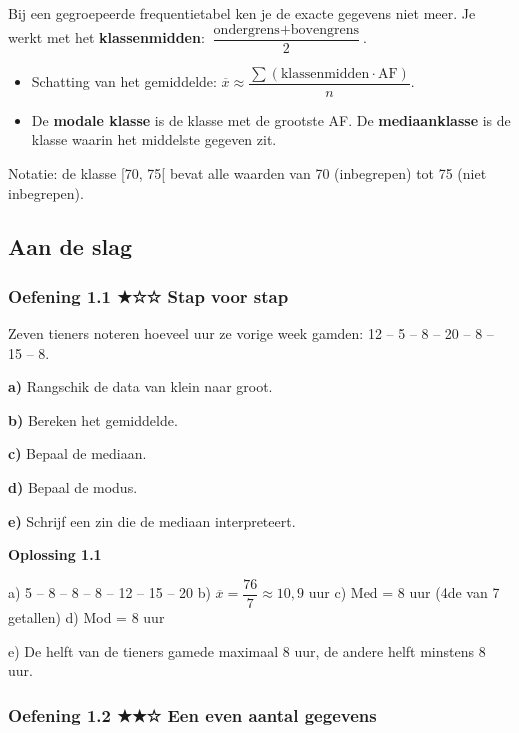 \begin{theorie}
Bij een gegroepeerde frequentietabel ken je de exacte gegevens niet meer. Je werkt met het \textbf{klassenmidden}: $\dfrac{\text{ondergrens}+\text{bovengrens}}{2}$.

\begin{itemize}
\item Schatting van het gemiddelde: $\overline{x}\approx\dfrac{\sum(\text{klassenmidden}\cdot \text{AF})}{n}$.
\item De \textbf{modale klasse} is de klasse met de grootste AF. De \textbf{mediaanklasse} is de klasse waarin het middelste gegeven zit.
\end{itemize}

Notatie: de klasse [70, 75[ bevat alle waarden van 70 (inbegrepen) tot 75 (niet inbegrepen).
\end{theorie}

\subsection*{Aan de slag}

\subsubsection*{Oefening 1.1 \quad ★☆☆ \quad Stap voor stap}

Zeven tieners noteren hoeveel uur ze vorige week gamden: 12 – 5 – 8 – 20 – 8 – 15 – 8.

\textbf{a)} Rangschik de data van klein naar groot. \lijn

\textbf{b)} Bereken het gemiddelde. \lijn

\textbf{c)} Bepaal de mediaan. \lijn

\textbf{d)} Bepaal de modus. \lijn

\textbf{e)} Schrijf een zin die de mediaan interpreteert. \lijn

\begin{oplossing}
\textbf{Oplossing 1.1}

a) 5 – 8 – 8 – 8 – 12 – 15 – 20 \quad b) $\overline{x}=\dfrac{76}{7}\approx 10{,}9$ uur \quad c) Med = 8 uur (4de van 7 getallen) \quad d) Mod = 8 uur

e) De helft van de tieners gamede maximaal 8 uur, de andere helft minstens 8 uur.
\end{oplossing}

\subsubsection*{Oefening 1.2 \quad ★★☆ \quad Een even aantal gegevens}

